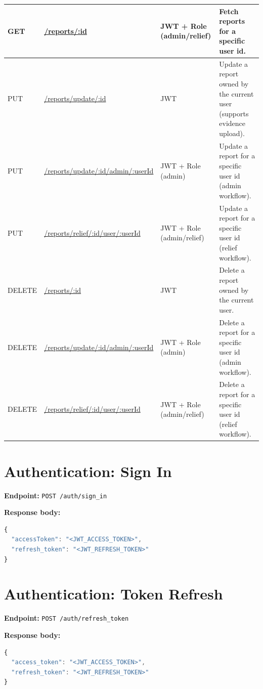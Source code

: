 \begin{table}[H]
\begin{tabularx}{\textwidth}{|l|p{4.6cm}|p{3.1cm}|X|}
\hline
GET & \url{/reports/:id} & JWT + Role (admin/relief) & Fetch reports for a specific user id. \\
\hline
PUT & \url{/reports/update/:id} & JWT & Update a report owned by the current user (supports evidence upload). \\
\hline
PUT & \url{/reports/update/:id/admin/:userId} & JWT + Role (admin) & Update a report for a specific user id (admin workflow). \\
\hline
PUT & \url{/reports/relief/:id/user/:userId} & JWT + Role (admin/relief) & Update a report for a specific user id (relief workflow). \\
\hline
DELETE & \url{/reports/:id} & JWT & Delete a report owned by the current user. \\
\hline
DELETE & \url{/reports/update/:id/admin/:userId} & JWT + Role (admin) & Delete a report for a specific user id (admin workflow). \\
\hline
DELETE & \url{/reports/relief/:id/user/:userId} & JWT + Role (admin/relief) & Delete a report for a specific user id (relief workflow). \\
\hline
\end{tabularx}
\end{table}

\section{Authentication: Sign In}

\textbf{Endpoint:} \texttt{POST /auth/sign\_in}

\textbf{Response body:}
\begin{lstlisting}[language=JavaScript, caption=Sign In Response, label=lst:signin-response]
{
  "accessToken": "<JWT_ACCESS_TOKEN>",
  "refresh_token": "<JWT_REFRESH_TOKEN>"
}
\end{lstlisting}

\section{Authentication: Token Refresh}

\textbf{Endpoint:} \texttt{POST /auth/refresh\_token}

\textbf{Response body:}
\begin{lstlisting}[language=JavaScript, caption=Refresh Token Response, label=lst:refresh-token-response]
{
  "access_token": "<JWT_ACCESS_TOKEN>",
  "refresh_token": "<JWT_REFRESH_TOKEN>"
}
\end{lstlisting}


